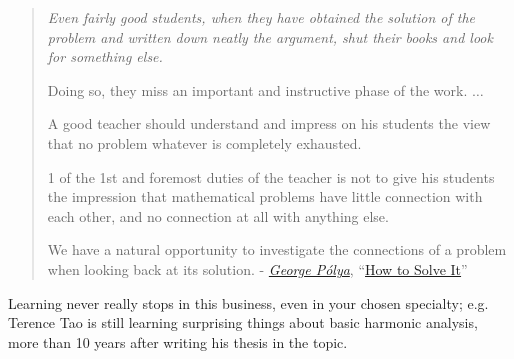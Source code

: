 \documentclass{article}
\begin{document}
\begin{quotation}
	\it
	Even fairly good students, when they have obtained the solution of the problem and written down neatly the argument, shut their books and look for something else.
	
	Doing so, they miss an important and instructive phase of the work. $\ldots$
	
	A good teacher should understand and impress on his students the view that no problem whatever is completely exhausted.
	
	1 of the 1st and foremost duties of the teacher is not to give his students the impression that mathematical problems have little connection with each other, and no connection at all with anything else.
	
	We have a natural opportunity to investigate the connections of a problem when looking back at its solution. - \href{http://en.wikipedia.org/wiki/George_P%C3%B3lya}{\emph{George Pólya}}, ``\href{http://en.wikipedia.org/wiki/How_to_Solve_It}{How to Solve It}''
\end{quotation}
Learning never really stops in this business, even in your chosen specialty; e.g. Terence Tao is still learning surprising things about basic harmonic analysis, more than 10 years after writing his thesis in the topic.
\end{document}

